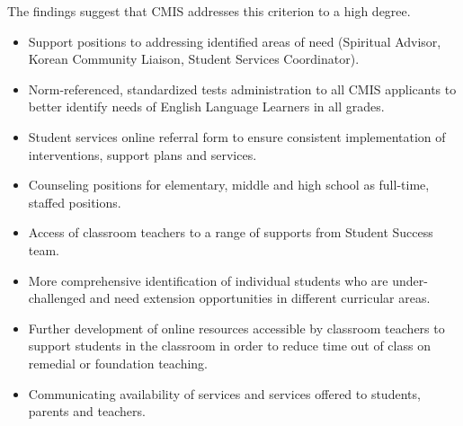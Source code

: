 \begin{findings}
The findings suggest that CMIS addresses this criterion to a high degree.

\begin{itemize}
\item Support positions to addressing identified areas of need (Spiritual Advisor, Korean Community Liaison, Student Services Coordinator).
\item Norm-referenced, standardized tests administration to all CMIS applicants to better identify needs of English Language Learners in all grades.
\item Student services online referral form to ensure consistent implementation of interventions, support plans and services.
\item Counseling positions for elementary, middle and high school as full-time, staffed positions.
\item Access of classroom teachers to a range of supports from Student Success team.
\end{itemize}

\begin{itemize}
\item More comprehensive identification of individual students who are under-challenged and need  extension opportunities in different curricular areas.
\item Further development of online resources accessible by classroom teachers to support students in the classroom in order to reduce time out of class on remedial or foundation teaching.
\item Communicating availability of services and services offered to students, parents and teachers.
\end{itemize}
\end{findings}
